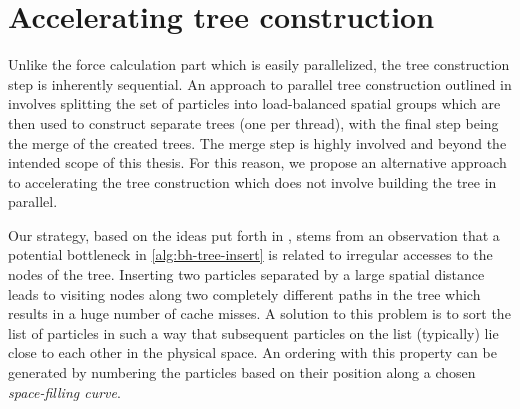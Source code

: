 \section{Accelerating tree construction}\label{sec:accelerating-tree-construction}
Unlike the force calculation part which is easily parallelized, the tree construction step is inherently sequential.
An approach to parallel tree construction outlined in \cite{warren_salmon_1993} involves splitting the set of particles into load-balanced spatial groups which are then used to construct separate trees (one per thread), with the final step being the merge of the created trees.
The merge step is highly involved and beyond the intended scope of this thesis.
For this reason, we propose an alternative approach to accelerating the tree construction which does not involve building the tree in parallel.

Our strategy, based on the ideas put forth in \cite{warren_salmon_1993}, stems from an observation that a potential bottleneck in \autoref{alg:bh-tree-insert} is related to irregular accesses to the nodes of the tree.
Inserting two particles separated by a large spatial distance leads to visiting nodes along two completely different paths in the tree which results in a huge number of cache misses.
A solution to this problem is to sort the list of particles in such a way that subsequent particles on the list (typically) lie close to each other in the physical space.
An ordering with this property can be generated by numbering the particles based on their position along a chosen \textit{space-filling curve}.

